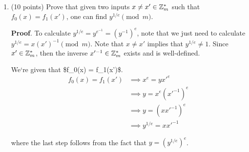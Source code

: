 \documentclass{article}
\begin{document}
\begin{enumerate}
\begin{enumerate}[,label=\alph*.]%

\item{}
(10 points) Prove that given two inputs $x \neq x' \in \mathbb{Z}^*_m$ such that $f_0(x)=f_1(x')$, one can find $y^{1/e} \pmod{m}$.%

\begin{mdbmarginx}{1ex}{0pt}{1ex}{0pt}%
\noindent{}\textbf{Proof}.  To calculate $y^{1/e} = y^{e^{-1}} = (y^{-1})^e$, note that we just need to calculate $y^{1/e} = x(x')^{-1} \pmod{m}$.
Note that $x \neq x'$ implies that $y^{1/e} \neq 1$. Since $x' \in \mathbb{Z}_m^*$, then the inverse
$x'^{-1} \in \mathbb{Z}_m^*$ exists and is well-defined.%
\end{mdbmarginx}%

We\textquoteleft{}re given that \$f\_0(x) = f\_1(x\textquoteright{})\$.%
\noindent\noindent\[%
\begin{aligned}
f_0(x) = f_1(x') &\implies x^e =yx'^e \\
&\implies y = x^e(x'^{-1})^e \\
&\implies y = (xx'^{-1})^e \\
&\implies y^{1/e} =xx'^{-1} 
\end{aligned}
\]%

where the last step follows from the fact that $y = (y^{1/e})^e$.%


\end{enumerate}
\end{enumerate}
\end{document}
